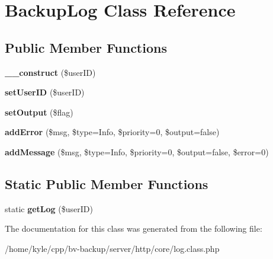 \hypertarget{class_backup_log}{}\section{Backup\+Log Class Reference}
\label{class_backup_log}
\subsection*{Public Member Functions}
\begin{DoxyCompactItemize}
\item 
\mbox{\label{class_backup_log_aabfb60abae06cf690e5ccfc728105531}} 
{\bfseries \+\_\+\+\_\+construct} (\$user\+ID)
\item 
\mbox{\label{class_backup_log_acf30ac12c849476b251e00d3cd8353b1}} 
{\bfseries set\+User\+ID} (\$user\+ID)
\item 
\mbox{\label{class_backup_log_a9ad64d907c5c454f4b26f4c130f8d489}} 
{\bfseries set\+Output} (\$flag)
\item 
\mbox{\label{class_backup_log_aa053b23128c631fe63eeb41814cd1152}} 
{\bfseries add\+Error} (\$msg, \$type=\textquotesingle{}Info\textquotesingle{}, \$priority=0, \$output=false)
\item 
\mbox{\label{class_backup_log_acba0c600bb1357c82712cb14f63900f9}} 
{\bfseries add\+Message} (\$msg, \$type=\textquotesingle{}Info\textquotesingle{}, \$priority=0, \$output=false, \$error=0)
\end{DoxyCompactItemize}
\subsection*{Static Public Member Functions}
\begin{DoxyCompactItemize}
\item 
\mbox{\label{class_backup_log_a827500235e604611037af2368a5b4141}} 
static {\bfseries get\+Log} (\$user\+ID)
\end{DoxyCompactItemize}


The documentation for this class was generated from the following file\+:\begin{DoxyCompactItemize}
\item 
/home/kyle/cpp/bv-\/backup/server/http/core/log.\+class.\+php\end{DoxyCompactItemize}
